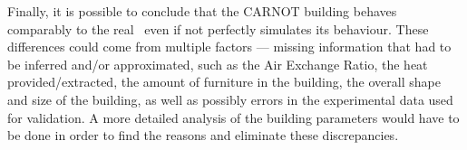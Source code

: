 Finally, it is possible to conclude that the CARNOT building behaves comparably
to the real \pdome\, even if not perfectly simulates its behaviour. These
differences  could come from multiple factors --- missing information that had
to be inferred and/or approximated, such as the Air Exchange Ratio, the heat
provided/extracted, the amount of furniture in the building, the overall shape
and size of the building, as well as possibly errors in the experimental data
used for validation. A more detailed analysis of the building parameters would
have to be done in order to find the reasons and eliminate these discrepancies.

\clearpage
